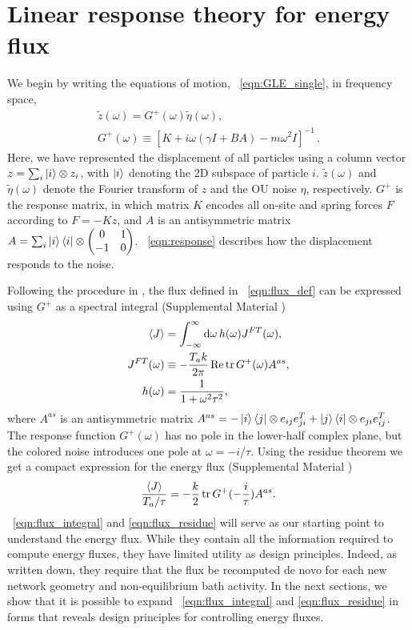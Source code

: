 \documentclass[
 preprint,
 preprintnumbers,
 amsmath,amssymb,
 aps,
 pre,
 longbibliography,
 superscriptaddress,
 10pt, twocolumn
]{revtex4-1}
\begin{document}
\section{Linear response theory for energy flux} \label{sec:linear_response}
We begin by writing the equations of motion, \eqnname~\eqref{eqn:GLE_single}, in frequency space,
\begin{gather}
    \tilde{z}(\omega) = G^+(\omega) \tilde{\eta}(\omega), \label{eqn:response} \\
    G^{+}(\omega) \equiv [K + i\omega(\gamma I + BA) - m\omega^2I]^{-1}\,. \label{eqn:response_G}
\end{gather}
Here, we have represented the displacement of all particles using a column vector $z=\sum_i \ket{i}\otimes z_i$, with $\ket{i}$ denoting the 2D subspace of particle $i$. $\tilde{z}(\omega)$ and $\tilde{\eta}(\omega)$ denote the Fourier transform of $z$ and the OU noise $\eta$, respectively. $G^+$ is the response matrix, in which matrix $K$ encodes all on-site and spring forces $F$ according to $F=-Kz$, and $A$ is an antisymmetric matrix $A=\sum_i \ket{i}\bra{i}\otimes \mqty(0 & 1 \\ -1 & 0)$. \eqnname~\eqref{eqn:response} describes how the displacement responds to the noise.

Following the procedure in \cite{Kundu2011LargeDeviations}, the flux defined in \eqnname~\eqref{eqn:flux_def} can be expressed using $G^+$ as a spectral integral (Supplemental Material \cite{SupplementalMaterial})
\begin{align}
    \expval{J} &= \int_{-\infty}^\infty \dd{\omega} h(\omega) J^{FT}(\omega), \label{eqn:flux_integral} \\
    J^{FT}(\omega) &\equiv -\frac{T_a k}{2\pi} \Re \tr G^+(\omega)A^{as}, \\
    h(\omega) &= \frac{1}{1+\omega^2\tau^2},
\end{align}
where $A^{as}$ is an antisymmetric matrix
$A^{as} = -\ket{i}\bra{j} \otimes e_{ij}e_{ji}^T + \ket{j}\bra{i} \otimes e_{ji}e_{ij}^T$.
The response function $G^+(\omega)$ has no pole in the lower-half complex plane, but the colored noise introduces one pole at $\omega = -i/\tau$. Using the residue theorem we get a compact expression for the energy flux (Supplemental Material \cite{SupplementalMaterial})
\begin{equation} \label{eqn:flux_residue}
    \frac{\expval{J}}{T_a/\tau} = -\frac{k}{2} \tr G^+(-\frac{i}{\tau})A^{as} .
\end{equation}
\eqnname~\eqref{eqn:flux_integral} and \eqref{eqn:flux_residue} will serve as our starting point to understand the energy flux. While they contain all the information required to compute energy fluxes, they have limited utility as design principles. Indeed, as written down, they require that the flux be recomputed de novo for each new network geometry and non-equilibrium bath activity. In the next sections, we show that it is possible to expand \eqnname~\eqref{eqn:flux_integral} and \eqref{eqn:flux_residue} in forms that reveals design principles for controlling energy fluxes.
\end{document}
